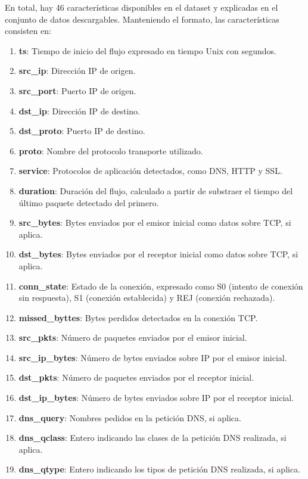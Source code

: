 En total, hay 46 características disponibles en el dataset y explicadas en el conjunto de datos descargables. Manteniendo el formato, las características consisten en:

\begin{enumerate}
  \item \textbf{ts}: Tiempo de inicio del flujo expresado en tiempo Unix con segundos.
  \item \textbf{src\_ip}: Dirección IP de origen.
  \item \textbf{src\_port}: Puerto IP de origen.
  \item \textbf{dst\_ip}: Dirección IP de destino.
  \item \textbf{dst\_proto}: Puerto IP de destino.
  \item \textbf{proto}: Nombre del protocolo transporte utilizado.
  \item \textbf{service}: Protocolos de aplicación detectados, como DNS, HTTP y SSL.
  \item \textbf{duration}: Duración del flujo, calculado a partir de substraer el tiempo del último paquete detectado del primero.
  \item \textbf{src\_bytes}: Bytes enviados por el emisor inicial como datos sobre TCP, si aplica.
  \item \textbf{dst\_bytes}: Bytes enviados por el receptor inicial como datos sobre TCP, si aplica.
  \item \textbf{conn\_state}: Estado de la conexión, expresado como S0 (intento de conexión sin respuesta), S1 (conexión establecida) y REJ (conexión rechazada).
  \item \textbf{missed\_byttes}: Bytes perdidos detectados en la conexión TCP.
  \item \textbf{src\_pkts}: Número de paquetes enviados por el emisor inicial.
  \item \textbf{src\_ip\_bytes}: Número de bytes enviados sobre IP por el emisor inicial.
  \item \textbf{dst\_pkts}: Número de paquetes enviados por el receptor inicial.
  \item \textbf{dst\_ip\_bytes}: Número de bytes enviados sobre IP por el receptor inicial.
  \item \textbf{dns\_query}: Nombres pedidos en la petición DNS, si aplica.
  \item \textbf{dns\_qclass}: Entero indicando las clases de la petición DNS realizada, si aplica.
  \item \textbf{dns\_qtype}: Entero indicando los tipos de petición DNS realizada, si aplica.

\end{enumerate}
